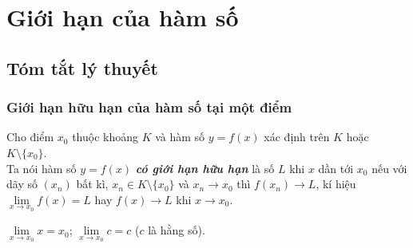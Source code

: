 
\section{Giới hạn của hàm số}

\subsection{Tóm tắt lý thuyết}
\begin{tomtat}
	\subsubsection{Giới hạn hữu hạn của hàm số tại một điểm}

\begin{dn}
	Cho điểm $ x_0 $ thuộc khoảng $ K $ và hàm số $ y=f(x) $ xác định trên $ K $ hoặc $ K\setminus\{x_0\} $.\\
	Ta nói hàm số $ y=f(x) $ \textbf{\textit{có giới hạn hữu hạn}} là số $ L $ khi $ x $ dần tới $ x_0 $ nếu với dãy số $ (x_n) $ bất kì, $ x_n\in K\setminus\{x_0\} $ và $ x_n \to x_0 $ thì $ f(x_n)\to L $, kí hiệu $ \lim \limits_{x \to x_0} f(x) =L$ hay $ f(x)\to L $ khi $ x\to x_0 $.
\end{dn}

\begin{note} 
	$ \lim \limits_{x \to x_0} x=x_0 $; \quad $ \lim \limits_{x \to x_0} c=c $ ($ c $ là hằng số).
\end{note} 

\end{tomtat}
